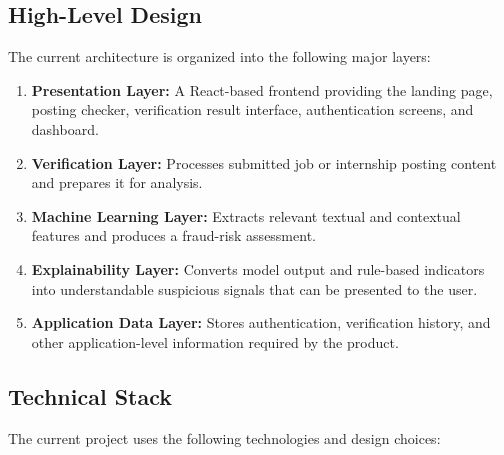 \documentclass[12pt,a4paper]{report}
\begin{document}
\subsection{High-Level Design}

The current architecture is organized into the following major layers:

\begin{enumerate}

    \item \textbf{Presentation Layer:}
    A React-based frontend providing the landing page, posting checker, verification result interface, authentication screens, and dashboard.

    \item \textbf{Verification Layer:}
    Processes submitted job or internship posting content and prepares it for analysis.

    \item \textbf{Machine Learning Layer:}
    Extracts relevant textual and contextual features and produces a fraud-risk assessment.

    \item \textbf{Explainability Layer:}
    Converts model output and rule-based indicators into understandable suspicious signals that can be presented to the user.

    \item \textbf{Application Data Layer:}
    Stores authentication, verification history, and other application-level information required by the product.

\end{enumerate}


\subsection{Technical Stack}

The current project uses the following technologies and design choices:
\end{document}
